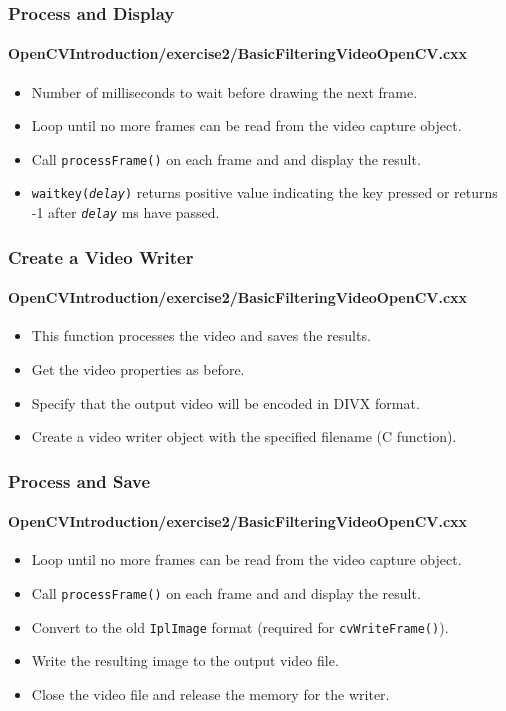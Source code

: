 \begin{frame}
\frametitle{Process and Display}
\framesubtitle{OpenCVIntroduction/exercise2/BasicFilteringVideoOpenCV.cxx}
\begin{center}
\begin{itemize}
\item Number of milliseconds to wait before drawing the next frame.
\item Loop until no more frames can be read from the video capture object.
\item Call {\tt\small processFrame()} on each frame and and display the result.
\item {\tt waitkey(\emph{delay})} returns positive value indicating the key pressed
      or returns -1 after {\tt \emph{delay}} ms have passed.
\end{itemize}
\end{center}
\end{frame}


\begin{frame}
\frametitle{Create a Video Writer}
\framesubtitle{OpenCVIntroduction/exercise2/BasicFilteringVideoOpenCV.cxx}
\begin{center}
\begin{itemize}
\item This function processes the video and saves the results.
\item Get the video properties as before.
\item Specify that the output video will be encoded in DIVX format.
\item Create a video writer object with the specified filename (C function).
\end{itemize}
\end{center}
\end{frame}


\begin{frame}
\frametitle{Process and Save}
\framesubtitle{OpenCVIntroduction/exercise2/BasicFilteringVideoOpenCV.cxx}
\begin{center}
\begin{itemize}
\item Loop until no more frames can be read from the video capture object.
\item Call {\tt\small processFrame()} on each frame and and display the result.
\item Convert to the old {\tt\small IplImage} format
      (required for {\tt\small cvWriteFrame()}).
\item Write the resulting image to the output video file.
\item Close the video file and release the memory for the writer.
\end{itemize}
\end{center}
\end{frame}

